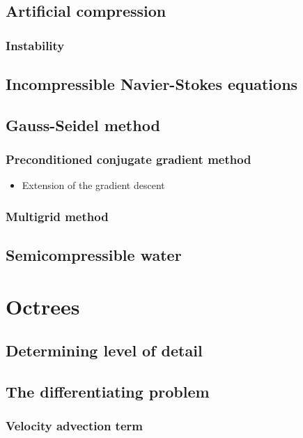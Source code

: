 \documentclass[a4paper]{report}
\begin{document}
\section{Artificial compression}

\subsection{Instability}

\section{Incompressible Navier-Stokes equations}

\section{Gauss-Seidel method}

\subsection{Preconditioned conjugate gradient method}

\begin{itemize}
    \item Extension of the gradient descent
\end{itemize}

\subsection{Multigrid method}

\section{Semicompressible water}

\chapter{Octrees}

\section{Determining level of detail}

\section{The differentiating problem}

\subsection{Velocity advection term}
\end{document}
